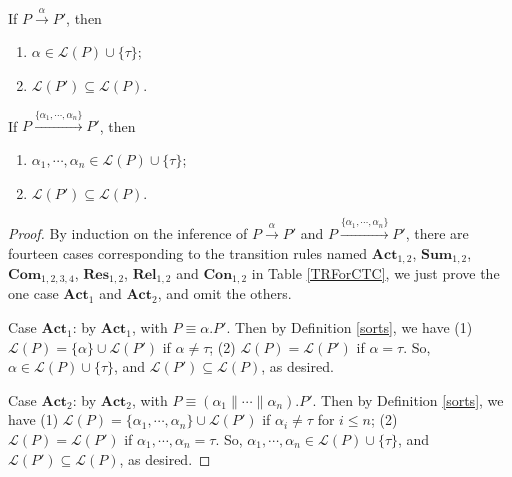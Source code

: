 \begin{proposition}
If $P\xrightarrow{\alpha}P'$, then
\begin{enumerate}
  \item $\alpha\in\mathcal{L}(P)\cup\{\tau\}$;
  \item $\mathcal{L}(P')\subseteq\mathcal{L}(P)$.
\end{enumerate}

If $P\xrightarrow{\{\alpha_1,\cdots,\alpha_n\}}P'$, then
\begin{enumerate}
  \item $\alpha_1,\cdots,\alpha_n\in\mathcal{L}(P)\cup\{\tau\}$;
  \item $\mathcal{L}(P')\subseteq\mathcal{L}(P)$.
\end{enumerate}
\end{proposition}

\begin{proof}
By induction on the inference of $P\xrightarrow{\alpha}P'$ and $P\xrightarrow{\{\alpha_1,\cdots,\alpha_n\}}P'$, there are fourteen cases corresponding to the transition rules named $\textbf{Act}_{1,2}$, $\textbf{Sum}_{1,2}$, $\textbf{Com}_{1,2,3,4}$, $\textbf{Res}_{1,2}$, $\textbf{Rel}_{1,2}$ and $\textbf{Con}_{1,2}$ in Table \ref{TRForCTC}, we just prove the one case $\textbf{Act}_1$ and $\textbf{Act}_2$, and omit the others.

Case $\textbf{Act}_1$: by $\textbf{Act}_1$, with $P\equiv\alpha.P'$. Then by Definition \ref{sorts}, we have (1) $\mathcal{L}(P)=\{\alpha\}\cup\mathcal{L}(P')$ if $\alpha\neq\tau$; (2) $\mathcal{L}(P)=\mathcal{L}(P')$ if $\alpha=\tau$. So, $\alpha\in\mathcal{L}(P)\cup\{\tau\}$, and $\mathcal{L}(P')\subseteq\mathcal{L}(P)$, as desired.

Case $\textbf{Act}_2$: by $\textbf{Act}_2$, with $P\equiv(\alpha_1\parallel\cdots\parallel\alpha_n).P'$. Then by Definition \ref{sorts}, we have (1) $\mathcal{L}(P)=\{\alpha_1,\cdots,\alpha_n\}\cup\mathcal{L}(P')$ if $\alpha_i\neq\tau$ for $i\leq n$; (2) $\mathcal{L}(P)=\mathcal{L}(P')$ if $\alpha_1,\cdots,\alpha_n=\tau$. So, $\alpha_1,\cdots,\alpha_n\in\mathcal{L}(P)\cup\{\tau\}$, and $\mathcal{L}(P')\subseteq\mathcal{L}(P)$, as desired.
\end{proof} 
